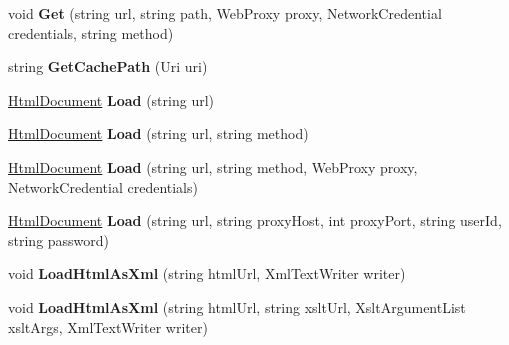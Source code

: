 \begin{DoxyCompactItemize}
void {\bfseries Get} (string url, string path, Web\+Proxy proxy, Network\+Credential credentials, string method)
\item 
\mbox{\label{class_html_agility_pack_1_1_html_web_af4bb02fc4e61f9fb184bb3adf951ba29}} 
string {\bfseries Get\+Cache\+Path} (Uri uri)
\item 
\mbox{\label{class_html_agility_pack_1_1_html_web_a5a6f931d515b78d0ad88c00602e66a93}} 
\hyperlink{class_html_agility_pack_1_1_html_document}{Html\+Document} {\bfseries Load} (string url)
\item 
\mbox{\label{class_html_agility_pack_1_1_html_web_a63115a52cc0785e2170f1ae1fca32105}} 
\hyperlink{class_html_agility_pack_1_1_html_document}{Html\+Document} {\bfseries Load} (string url, string method)
\item 
\mbox{\label{class_html_agility_pack_1_1_html_web_ad341a6bd5fca16be62af30a028228404}} 
\hyperlink{class_html_agility_pack_1_1_html_document}{Html\+Document} {\bfseries Load} (string url, string method, Web\+Proxy proxy, Network\+Credential credentials)
\item 
\mbox{\label{class_html_agility_pack_1_1_html_web_a0c4d65827cb2e99af92e97a1b60dcb5f}} 
\hyperlink{class_html_agility_pack_1_1_html_document}{Html\+Document} {\bfseries Load} (string url, string proxy\+Host, int proxy\+Port, string user\+Id, string password)
\item 
\mbox{\label{class_html_agility_pack_1_1_html_web_ad8ef0d1d7a4e6997a29cea1eea467294}} 
void {\bfseries Load\+Html\+As\+Xml} (string html\+Url, Xml\+Text\+Writer writer)
\item 
\mbox{\label{class_html_agility_pack_1_1_html_web_a94d1cbc45abd329ced10f5eae232bab6}} 
void {\bfseries Load\+Html\+As\+Xml} (string html\+Url, string xslt\+Url, Xslt\+Argument\+List xslt\+Args, Xml\+Text\+Writer writer)
\item 
\mbox{\label{class_html_agility_pack_1_1_html_web_aefb59d8fafb367664cfddf6b00532030}} 

\end{DoxyCompactItemize}
